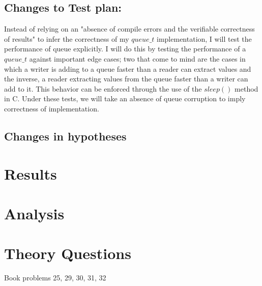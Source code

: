 \documentclass[]{article}
\begin{document}
\subsection{Changes to Test plan:}
Instead of relying on an "absence of compile errors and the verifiable correctness of results" to infer the correctness of my $queue\_t$ implementation, I will test the performance of queue explicitly. I will do this by testing the performance of a $queue\_t$ against important edge cases; two that come to mind are the cases in which a writer is adding to a queue faster than a reader can extract values and the inverse, a reader extracting values from the queue faster than a writer can add to it. This behavior can be enforced through the use of the $sleep()$ method in C. Under these tests, we will take an absence of queue corruption to imply correctness of implementation.

\subsection{Changes in hypotheses}

\section{Results}

\section{Analysis}


\section{Theory Questions}
Book problems 25, 29, 30, 31, 32
	
	
\end{document}

